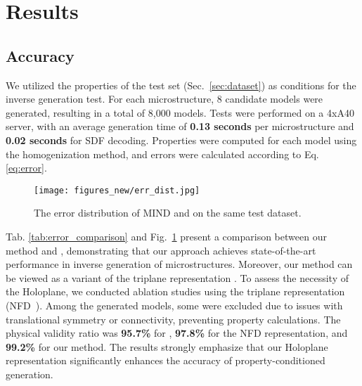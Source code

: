 \section{Results}

\subsection{Accuracy}
\label{sec:accuracy}
We utilized the properties of the test set (Sec.~\ref{sec:dataset}) as conditions for the inverse generation test.
For each microstructure, 8 candidate models were generated, resulting in a total of 8,000 models.
Tests were performed on a 4xA40 server, with an average generation time of \textbf{0.13 seconds} per microstructure and \textbf{0.02 seconds} for SDF decoding.
Properties were computed for each model using the homogenization method, and errors were calculated according to Eq.\ref{eq:error}.

\begin{figure}
    \centering
    \texttt{[image: figures\_new/err\_dist.jpg]}
    \caption{The error distribution of MIND and \cite{Yang2024} on the same test dataset.}
    \label{fig:err_dist}
\end{figure} 


Tab. \ref{tab:error_comparison} and Fig.~\ref{fig:err_dist} present a comparison between our method and \cite{Yang2024}, demonstrating that our approach achieves state-of-the-art performance in inverse generation of microstructures. 
Moreover, our method can be viewed as a variant of the triplane representation \cite{chan2022triplane, Shue2023}.
To assess the necessity of the Holoplane, we conducted ablation studies using the triplane representation (NFD~\cite{Shue2023}). 
Among the generated models, some were excluded due to issues with translational symmetry or connectivity, preventing property calculations.
The physical validity ratio was \textbf{95.7\%} for \cite{Yang2024}, \textbf{97.8\%} for the NFD representation, and \textbf{99.2\%} for our method.
The results strongly emphasize that our Holoplane representation significantly enhances the accuracy of property-conditioned generation.


